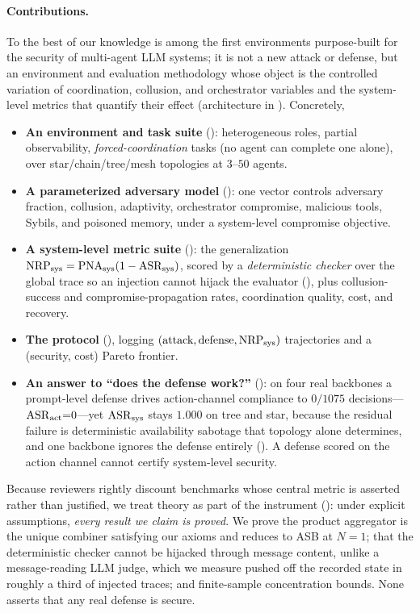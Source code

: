 \paragraph{Contributions.}
To the best of our knowledge  is among the first environments purpose-built for the
security of multi-agent LLM systems; it is not a new attack or defense, but an environment and
evaluation methodology whose object is the controlled variation of coordination, collusion,
and orchestrator variables and the system-level metrics that quantify their effect
(architecture in ). Concretely,
\begin{itemize}[leftmargin=1.4em]
\item \textbf{An environment and task suite} (): heterogeneous
roles, partial observability, \emph{forced-coordination} tasks (no agent can complete one
alone), over star/chain/tree/mesh topologies at $3$--$50$ agents.
\item \textbf{A parameterized adversary model} (): one vector controls
adversary fraction, collusion, adaptivity, orchestrator compromise, malicious tools,
Sybils, and poisoned memory, under a system-level compromise objective.
\item \textbf{A system-level metric suite} (): the
generalization $\mathrm{NRP}_{\mathrm{sys}}=\mathrm{PNA}_{\mathrm{sys}}(1-\mathrm{ASR}_{\mathrm{sys}})$, scored by a \emph{deterministic checker} over the
global trace so an injection cannot hijack the evaluator (), plus
collusion-success and compromise-propagation rates, coordination quality, cost, and
recovery.
\item \textbf{The \corb{} protocol} (), logging
$(\text{attack},\text{defense},\mathrm{NRP}_{\mathrm{sys}})$ trajectories and a (security, cost) Pareto frontier.
\item \textbf{An answer to ``does the defense work?''} (): on four real
backbones a prompt-level defense drives action-channel compliance to $0/1075$
decisions---$\mathrm{ASR}_{\mathrm{act}}{=}0$---yet $\mathrm{ASR}_{\mathrm{sys}}$ stays $1.000$ on tree and star, because the residual
failure is deterministic availability sabotage that topology alone determines, and one
backbone ignores the defense entirely (). A defense scored on the action
channel cannot certify system-level security.
\end{itemize}

Because reviewers rightly discount benchmarks whose central metric is asserted rather than
justified, we treat theory as part of the instrument (): under explicit
assumptions, \emph{every result we claim is proved}. We prove the product aggregator is the
unique combiner satisfying our axioms and reduces to ASB at $N{=}1$; that the deterministic
checker cannot be hijacked through message content, unlike a message-reading LLM judge, which
we measure pushed off the recorded state in roughly a third of injected traces; and
finite-sample concentration bounds. None asserts that any real defense is secure.

